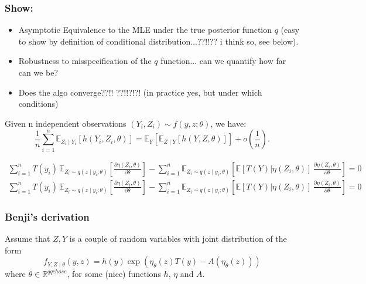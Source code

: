 \documentclass[twoside,11pt]{article}
\newcommand{\R}{{\mathbb{R}}}
\begin{document}
\subsubsection{Show:}

\begin{itemize}
    \item Asymptotic Equivalence to the MLE under the true posterior function $q$ (easy to show by definition of conditional distribution...??!!?? i think so, see below).
    \item Robustness to misspecification of the $q$ function... can we quantify how far can we be?
    \item Does the algo converge??!! ??!!?!?! (in practice yes, but under which conditions)
\end{itemize}

Given n  independent observations  $(Y_i, Z_i) \sim f(y, z; \theta)$, we have:
$$
\frac{1}{n} \sum_{i=1}^n \mathbb{E}_{Z_i \mid Y_i} \left[ h(Y_i, Z_i, \theta) \right] = \mathbb{E}_{Y} \left[ \mathbb{E}_{Z \mid Y} \left[ h(Y, Z, \theta) \right] \right] + o\left(\frac{1}{n}\right).
$$




\begin{align}
\sum_{i=1}^n T(y_i) \, \mathbb{E}_{Z_i\sim q(z \mid y_i; \theta)} \left[ \frac{\partial {\eta(Z_i, 
 \theta)}}{\partial \theta} \right] - \sum_{i=1}^n   \mathbb{E}_{Z_i \sim q(z \mid y_i; \theta)} \left[ \mathbb{E}[T(Y)|\eta(Z_i, \theta)] \,\frac{\partial \eta(Z_i, \theta)}{\partial \theta} \right] = 0 \\
 \sum_{i=1}^n T(y_i) \, \mathbb{E}_{Z_i\sim q(z \mid y_i; \theta)} \left[ \frac{\partial {\eta(Z_i, 
 \theta)}}{\partial \theta} \right] - \sum_{i=1}^n   \mathbb{E}_{Z_i \sim q(z \mid y_i; \theta)} \left[ \mathbb{E}[T(Y)|\eta(Z_i, \theta)] \,\frac{\partial \eta(Z_i, \theta)}{\partial \theta} \right] = 0
\end{align}




\newpage

\subsubsection{Benji's derivation}
Assume that $Z, Y$ is a couple of random variables with joint distribution of the form 
$$ f_{Y,Z\mid \theta}(y,z) = h(y) \exp\left( \eta_{\theta}(z) T(y) - A(\eta_{\theta}(z))\right) $$
where $\theta \in \R^{qqchose}$, for some (nice) functions $h$, $\eta$ and $A$.
\end{document}
